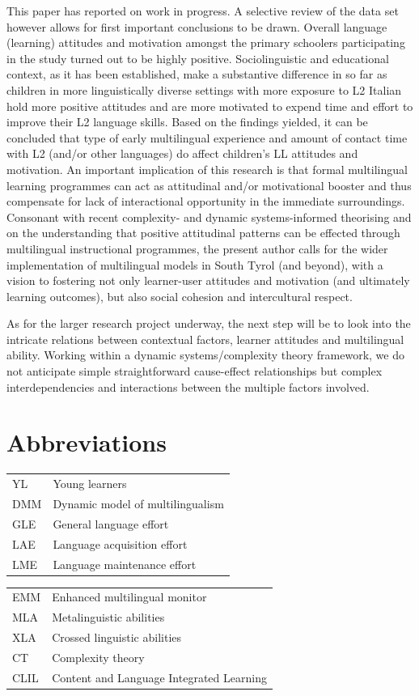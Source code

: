\documentclass[output=paper]{../langscibook}
\begin{document}
This paper has reported on work in progress. A selective review of the data set however allows for first important conclusions to be drawn. Overall language (learning) attitudes and motivation amongst the primary schoolers participating in the study turned out to be highly positive. Sociolinguistic and educational context, as it has been established, make a substantive difference in so far as children in more linguistically diverse settings with more exposure to L2 Italian hold more positive attitudes and are more motivated to expend time and effort to improve their L2 language skills. Based on the findings yielded, it can be concluded that type of early multilingual experience and amount of contact time with L2 (and/or other languages) do affect children’s LL attitudes and motivation. An important implication of this research is that formal multilingual learning programmes can act as attitudinal and/or motivational booster and thus compensate for lack of interactional opportunity in the immediate surroundings. Consonant with recent complexity- and dynamic systems-informed theorising and on the understanding that positive attitudinal patterns can be effected through multilingual instructional programmes, the present author calls for the wider implementation of multilingual models in South Tyrol (and beyond), with a vision to fostering not only learner-user attitudes and motivation (and ultimately learning outcomes), but also social cohesion and intercultural respect.

As for the larger research project underway, the next step will be to look into the intricate relations between contextual factors, learner attitudes and multilingual ability. Working within a dynamic systems\slash complexity theory framework, we do not anticipate simple straightforward cause-effect relationships but complex interdependencies and interactions between the multiple factors involved.

\section*{Abbreviations}
\label{sec:7:abbreviations}

\begin{tabularx}{.45\textwidth}{lQ}
YL  & Young learners\\
DMM & Dynamic model of  multilingualism\\
GLE & General language effort\\
LAE & Language acquisition effort\\
LME & Language maintenance effort\\
\end{tabularx}
\begin{tabularx}{.45\textwidth}{lQ}
EMM & Enhanced multilingual monitor\\
MLA & Metalinguistic abilities\\
XLA & Crossed linguistic abilities\\
CT  & Complexity theory\\
CLIL & Content and Language Integrated Learning\\
\end{tabularx}

{\sloppy\printbibliography[heading=subbibliography,notkeyword=this]}
\end{document}
